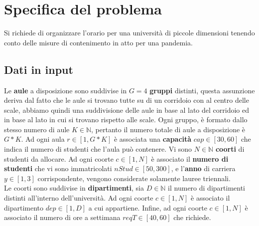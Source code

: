 \documentclass[12pt, italian, openany]{book}
\begin{document}
\chapter{Specifica del problema}
Si richiede di organizzare l'orario per una università di piccole dimensioni tenendo conto delle misure di contenimento in atto per una pandemia.

\section{Dati in input}
Le \textbf{aule} a disposizione sono suddivise in $G = 4$ \textbf{gruppi} distinti, questa assunzione deriva dal fatto che le aule si trovano tutte su di un corridoio con al centro delle scale, abbiamo quindi una suddivisione delle aule in base al lato del corridoio ed in base al lato in cui si trovano rispetto alle scale. Ogni gruppo, è formato dallo stesso numero di aule $K \in \mathbb{N}$, pertanto il numero totale di aule a disposizione è $G*K$.
Ad ogni aula $r \in \left[ 1,  G*K \right]$ è associata una \textbf{capacità} $cap \in \left[ 30,  60 \right]$ che indica il numero di studenti che l'aula può contenere.
Vi sono $N \in \mathbb{N}$ \textbf{coorti} di studenti da allocare. Ad ogni coorte $c \in \left[1, N \right]$ è associato il \textbf{numero di studenti} che vi sono immatricolati $nStud \in \left[50, 300 \right]$, e l'\textbf{anno} di carriera $y \in \left[1, 3 \right]$ corrispondente, vengono considerate solamente lauree triennali.\\
Le coorti sono suddivise in \textbf{dipartimenti}, sia $D \in \mathbb{N}$ il numero di dipartimenti distinti all'interno dell'università. Ad ogni coorte $c \in \left[1, N \right]$ è associato il dipartimento $dep \in \left[1, D \right]$ a cui appartiene.
Infine, ad ogni coorte $c \in \left[1, N \right]$ è associato il numero di ore a settimana $reqT \in \left[40, 60\right]$ che richiede.
\end{document}
